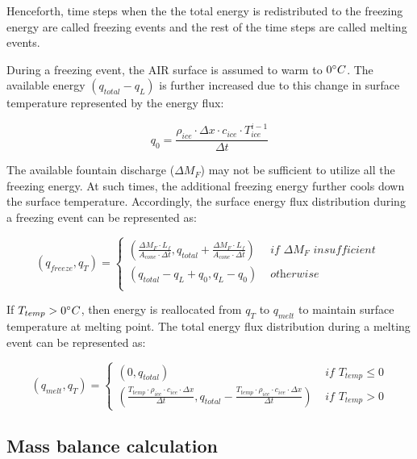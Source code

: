 \documentclass[utf8]{frontiersSCNS}
\begin{document}
Henceforth, time steps when the the total energy is redistributed to the freezing energy are called freezing
events and the rest of the time steps are called melting events.


During a freezing event, the AIR surface is assumed to warm to $0 \degree C$. The available energy
$(q_{total}-q_{L})$ is further increased due to this change in surface temperature represented by the energy
flux:

$$q_{0} = \frac{\rho_{ice} \cdot \Delta x \cdot c_{ice} \cdot T_{ice}^{i-1}}{\Delta t}$$

The available fountain discharge ($\Delta M_{F}$) may not be sufficient to utilize all the freezing energy. At such times, 
the additional freezing energy further cools down the surface temperature. Accordingly, the surface energy flux
distribution during a freezing event can be represented as:

\begin{equation}
	(q_{freeze}, q_{T}) = \left\{ \begin{array}{ll}
		(\frac{\Delta M_{F} \cdot L_f
		}{A_{cone} \cdot \Delta t}
		, q_{total}+\frac{\Delta M_{F} \cdot L_f
		}{A_{cone} \cdot \Delta t})          & \textit{ if  } \Delta M_{F} \textit{ insufficient }\\
		(q_{total}-q_{L}+q_{0}, q_{L}-q_{0}) & \textit{ otherwise }                                                                      \\
	\end{array} \right.
\end{equation}

If $T_{temp} > 0 \degree C$, then energy is reallocated from $q_{T}$ to $q_{melt}$ to maintain surface
temperature at melting point. The total energy flux distribution during a melting event can be represented as:

\begin{equation}
	(q_{melt}, q_{T}) = \left\{ \begin{array}{ll}
		(0, q_{total})
    & \textit{ if } T_{temp} \leq 0 \\
		(\frac{T_{temp} \cdot \rho_{ice} \cdot c_{ice} \cdot \Delta x}{\Delta t}, q_{total}-\frac{T_{temp} \cdot \rho_{ice} \cdot c_{ice} \cdot \Delta x}{\Delta t}  ) & \textit{ if } T_{temp} > 0
	\end{array} \right.
\end{equation}


\subsection{Mass balance calculation}
\end{document}

